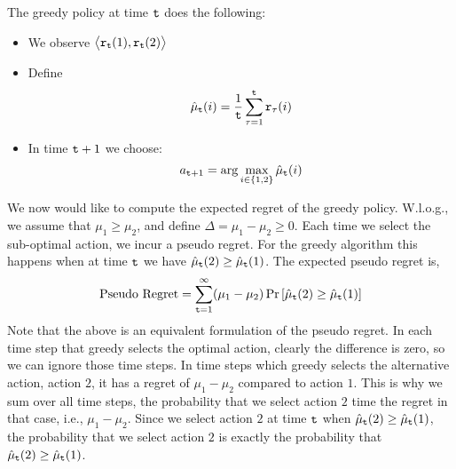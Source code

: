 The greedy policy at time ${\tt t}$ does the following:
\begin{itemize}
\item We observe $\big\langle {\tt r}_{{\tt t}}(1),{\tt r}_{{\tt t}}(2)\big\rangle$
\item Define
\[
\hat{\mu}_{{\tt t}}(i)=\frac{1}{{\tt t}} \sum_{\tau=1}^{{\tt t}}{\tt r}_{\tau}(i)
\]
\item In time ${\tt t}+1$ we choose:
\[
a_{{\tt t}+1}=\arg\max_{i\in\{1,2\}}\hat{\mu}_{{\tt t}}(i)
\]
\end{itemize}


We now would like to compute the expected regret of the greedy
policy. W.l.o.g., we assume that $\mu_{1}\ge\mu_{2}$, and define
$\Delta=\mu_{1}-\mu_{2}\ge0$. Each time we select the sub-optimal action, we incur a pseudo regret. For the greedy algorithm this happens when at time ${\tt t}$ we have $\hat{\mu}_{{\tt t}}(2)\ge \hat{\mu}_{{\tt t}}(1)$. The expected pseudo regret is,
\[
\text{Pseudo Regret}= \sum_{{\tt t}=1}^{\infty}(\mu_{1}-\mu_{2})
\Pr\left[\hat{\mu}_{{\tt t}}(2)\ge \hat{\mu}_{{\tt t}}(1)\right]
\]
Note that the above is an equivalent formulation of the pseudo regret. In each time step that greedy selects the optimal action, clearly the difference is zero, so we can ignore those time steps. In time steps which greedy selects the alternative action, action $2$, it has a regret of $\mu_1-\mu_2$ compared to action $1$. This is why we sum over all time steps, the probability that we select action $2$ time the regret in that case, i.e., $\mu_1-\mu_2$. Since we select action $2$ at time ${\tt t}$ when $\hat{\mu}_{{\tt t}}(2)\ge \hat{\mu}_{{\tt t}}(1)$, the probability that we select action $2$ is  exactly the probability that $\hat{\mu}_{{\tt t}}(2)\ge \hat{\mu}_{{\tt t}}(1)$.

